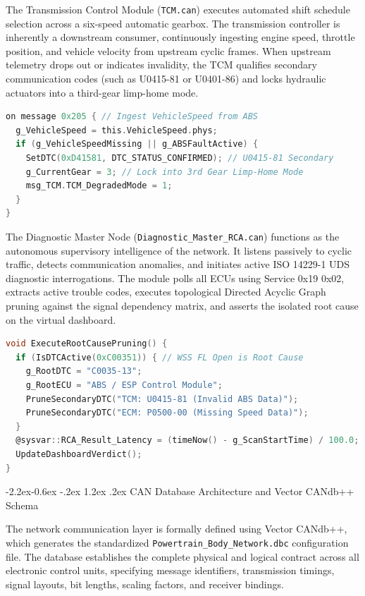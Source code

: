 \documentclass[11pt,a4paper]{article}
\makeatletter
\renewcommand{\subsection}{\@startsection{subsection}{2}{\z@}%
  {-2.2ex\@plus -0.6ex \@minus -.2ex}%
  {1.2ex \@plus .2ex}%
  {\normalfont\normalsize\bfseries\color{tatablue}}}
\makeatother
\begin{document}
The Transmission Control Module (\texttt{TCM.can}) executes automated shift schedule selection across a six-speed automatic gearbox. The transmission controller is inherently a downstream consumer, continuously ingesting engine speed, throttle position, and vehicle velocity from upstream cyclic frames. When upstream telemetry drops out or indicates invalidity, the TCM qualifies secondary communication codes (such as U0415-81 or U0401-86) and locks hydraulic actuators into a third-gear limp-home mode.

\begin{lstlisting}[language=C,caption={Cross-ECU Signal Consumption and Limp-Home Logic in TCM.can}]
on message 0x205 { // Ingest VehicleSpeed from ABS
  g_VehicleSpeed = this.VehicleSpeed.phys;
  if (g_VehicleSpeedMissing || g_ABSFaultActive) {
    SetDTC(0xD41581, DTC_STATUS_CONFIRMED); // U0415-81 Secondary
    g_CurrentGear = 3; // Lock into 3rd Gear Limp-Home Mode
    msg_TCM.TCM_DegradedMode = 1;
  }
}
\end{lstlisting}

The Diagnostic Master Node (\texttt{Diagnostic\_Master\_RCA.can}) functions as the autonomous supervisory intelligence of the network. It listens passively to cyclic traffic, detects communication anomalies, and initiates active ISO 14229-1 UDS diagnostic interrogations. The module polls all ECUs using Service 0x19 0x02, extracts active trouble codes, executes topological Directed Acyclic Graph pruning against the signal dependency matrix, and asserts the isolated root cause on the virtual dashboard.

\begin{lstlisting}[language=C,caption={Topological Signal Dependency Pruning Routine in Diagnostic\_Master\_RCA.can}]
void ExecuteRootCausePruning() {
  if (IsDTCActive(0xC00351)) { // WSS FL Open is Root Cause
    g_RootDTC = "C0035-13";
    g_RootECU = "ABS / ESP Control Module";
    PruneSecondaryDTC("TCM: U0415-81 (Invalid ABS Data)");
    PruneSecondaryDTC("ECM: P0500-00 (Missing Speed Data)");
  }
  @sysvar::RCA_Result_Latency = (timeNow() - g_ScanStartTime) / 100.0;
  UpdateDashboardVerdict();
}
\end{lstlisting}

\subsection{CAN Database Architecture and Vector CANdb++ Schema}

The network communication layer is formally defined using Vector CANdb++, which generates the standardized \texttt{Powertrain\_Body\_Network.dbc} configuration file. The database establishes the complete physical and logical contract across all electronic control units, specifying message identifiers, transmission timings, signal layouts, bit lengths, scaling factors, and receiver bindings.
\end{document}

